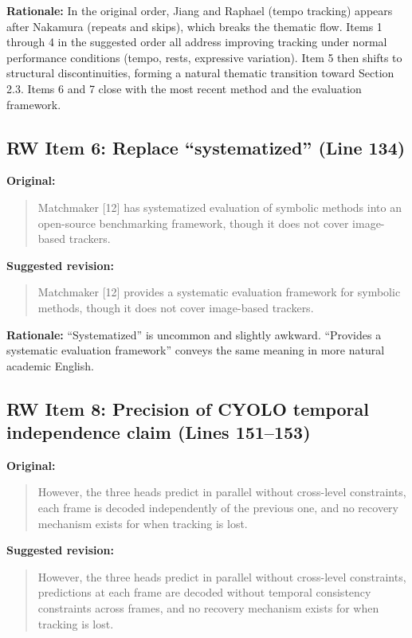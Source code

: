 \documentclass{article}
\begin{document}
\textbf{Rationale:}
In the original order, Jiang and Raphael (tempo tracking) appears after Nakamura (repeats and skips), which breaks the thematic flow. Items 1 through 4 in the suggested order all address improving tracking under normal performance conditions (tempo, rests, expressive variation). Item 5 then shifts to structural discontinuities, forming a natural thematic transition toward Section 2.3. Items 6 and 7 close with the most recent method and the evaluation framework.

\subsection*{RW Item 6: Replace ``systematized'' (Line 134)}

\textbf{Original:}
\begin{quote}
Matchmaker [12] has systematized evaluation of symbolic methods into an open-source benchmarking framework, though it does not cover image-based trackers.
\end{quote}

\textbf{Suggested revision:}
\begin{quote}
Matchmaker [12] provides a systematic evaluation framework for symbolic methods, though it does not cover image-based trackers.
\end{quote}

\textbf{Rationale:}
``Systematized'' is uncommon and slightly awkward. ``Provides a systematic evaluation framework'' conveys the same meaning in more natural academic English.

\subsection*{RW Item 8: Precision of CYOLO temporal independence claim (Lines 151--153)}

\textbf{Original:}
\begin{quote}
However, the three heads predict in parallel without cross-level constraints, each frame is decoded independently of the previous one, and no recovery mechanism exists for when tracking is lost.
\end{quote}

\textbf{Suggested revision:}
\begin{quote}
However, the three heads predict in parallel without cross-level constraints, predictions at each frame are decoded without temporal consistency constraints across frames, and no recovery mechanism exists for when tracking is lost.
\end{quote}
\end{document}

